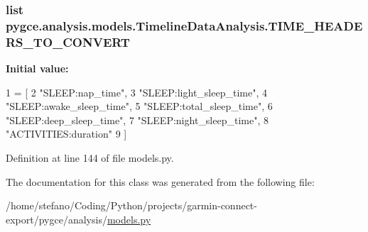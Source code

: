 \subsubsection[{\texorpdfstring{T\+I\+M\+E\+\_\+\+H\+E\+A\+D\+E\+R\+S\+\_\+\+T\+O\+\_\+\+C\+O\+N\+V\+E\+RT}{TIME_HEADERS_TO_CONVERT}}]{\setlength{\rightskip}{0pt plus 5cm}list pygce.\+analysis.\+models.\+Timeline\+Data\+Analysis.\+T\+I\+M\+E\+\_\+\+H\+E\+A\+D\+E\+R\+S\+\_\+\+T\+O\+\_\+\+C\+O\+N\+V\+E\+RT\hspace{0.3cm}{\ttfamily [static]}}\hypertarget{classpygce_1_1analysis_1_1models_1_1_timeline_data_analysis_afaebf4ce7e847ff4c32a7b9b799fd94d}{}\label{classpygce_1_1analysis_1_1models_1_1_timeline_data_analysis_afaebf4ce7e847ff4c32a7b9b799fd94d}
{\bfseries Initial value\+:}
\begin{DoxyCode}
1 = [
2         \textcolor{stringliteral}{"SLEEP:nap\_time"},
3         \textcolor{stringliteral}{"SLEEP:light\_sleep\_time"},
4         \textcolor{stringliteral}{"SLEEP:awake\_sleep\_time"},
5         \textcolor{stringliteral}{"SLEEP:total\_sleep\_time"},
6         \textcolor{stringliteral}{"SLEEP:deep\_sleep\_time"},
7         \textcolor{stringliteral}{"SLEEP:night\_sleep\_time"},
8         \textcolor{stringliteral}{"ACTIVITIES:duration"}
9     ]
\end{DoxyCode}


Definition at line 144 of file models.\+py.



The documentation for this class was generated from the following file\+:\begin{DoxyCompactItemize}
\item 
/home/stefano/\+Coding/\+Python/projects/garmin-\/connect-\/export/pygce/analysis/\hyperlink{models_8py}{models.\+py}\end{DoxyCompactItemize}
